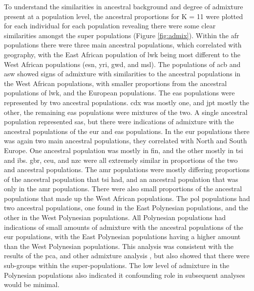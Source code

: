 \documentclass[]{report}
\begin{document}
To understand the similarities in ancestral background and degree of
admixture present at a population level, the ancestral proportions for K
= 11 were plotted for each individual for each population revealing
there were some clear similarities amongst the super populations (Figure
\ref{fig:admix}). Within the \gls{afr} populations there were three main
ancestral populations, which correlated with geography, with the East
African population of \gls{lwk} being most different to the West African
populations (\gls{esn}, \gls{yri}, \gls{gwd}, and \gls{msl}). The
populations of \gls{acb} and \gls{asw} showed signs of admixture with
similarities to the ancestral populations in the West African
populations, with smaller proportions from the ancestral populations of
\gls{lwk}, and the European populations. The \gls{eas} populations were
represented by two ancestral populations. \Gls{cdx} was mostly one, and
\gls{jpt} mostly the other, the remaining \gls{eas} populations were
mixtures of the two. A single ancestral population represented
\gls{sas}, but there were indications of admixture with the ancestral
populations of the \gls{eur} and \gls{eas} populations. In the \gls{eur}
populations there was again two main ancestral populations, they
correlated with North and South Europe. One ancestral population was
mostly in \gls{fin}, and the other mostly in \gls{tsi} and \gls{ibs}.
\gls{gbr}, \gls{ceu}, and \gls{nzc} were all extremely similar in
proportions of the two and ancestral populations. The \gls{amr}
populations were mostly differing proportions of the ancestral
population that \gls{tsi} had, and an ancestral population that was only
in the \gls{amr} populations. There were also small proportions of the
ancestral populations that made up the West African populations. The
\gls{pol} populations had two ancestral populations, one found in the
East Polynesian populations, and the other in the West Polynesian
populations. All Polynesian populations had indications of small amounts
of admixture with the ancestral populations of the \gls{eur}
populations, with the East Polynesian populations having a higher amount
than the West Polynesian populations. This analysis was consistent with
the results of the \gls{pca}, and other admixture analysis
\citep{Hellenthal2014, 1KGP2015snp}, but also showed that there were
sub-groups within the super-populations. The low level of admixture in
the Polynesian populations also indicated it confounding role in
subsequent analyses would be minimal.
\end{document}
